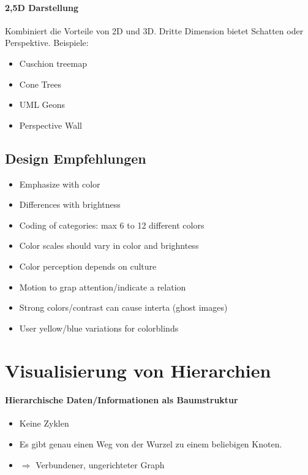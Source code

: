 \documentclass[ngerman]{scrartcl}
\begin{document}
\paragraph{2,5D Darstellung}
Kombiniert die Vorteile von 2D und 3D. Dritte Dimension bietet Schatten oder Perspektive. Beispiele:
\begin{itemize}
  \item Cuschion treemap
  \item Cone Trees
  \item UML Geons
  \item Perspective Wall
\end{itemize}


\subsection{Design Empfehlungen}
\begin{itemize}
  \item Emphasize with color
  \item Differences with brightness
  \item Coding of categories: max 6 to 12 different colors
  \item Color scales should vary in color and brighntess 
  \item Color perception depends on culture
  \item Motion to grap attention/indicate a relation
  \item Strong colors/contrast can cause interta (ghost images)
  \item User yellow/blue variations for colorblinds
\end{itemize}


\section{Visualisierung von Hierarchien}

\paragraph{Hierarchische Daten/Informationen als Baumstruktur}
\begin{itemize}
  \item Keine Zyklen
  \item Es gibt genau einen Weg von der Wurzel zu einem beliebigen Knoten.
  \item $ \Rightarrow $ Verbundener, ungerichteter Graph 
\end{itemize}
\end{document}
